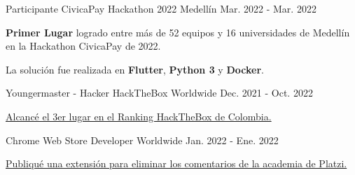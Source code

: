 
\begin{cventries}

  \cventry
    {Participante} %
    {CivicaPay Hackathon 2022} %
    {Medellín} %
    {Mar. 2022 - Mar. 2022} %
    {
      \begin{cvitems} %
        \item {\textbf{Primer Lugar} logrado entre más de 52 equipos y 16 universidades de Medellín en la Hackathon CivicaPay de 2022.}
        \item {La solución fue realizada en \textbf{Flutter}, \textbf{Python 3} y \textbf{Docker}.}
      \end{cvitems}
    }

  \cventry
    {Youngermaster - Hacker} %
    {HackTheBox} %
    {Worldwide} %
    {Dec. 2021 - Oct. 2022} %
    {
      \begin{cvitems} %
        \item {\href{https://app.hackthebox.com/profile/643960}{Alcancé el 3er lugar en el Ranking HackTheBox de Colombia.}}
      \end{cvitems}
    }

  \cventry
    {Chrome Web Store} %
    {Developer} %
    {Worldwide} %
    {Jan. 2022 - Ene. 2022} %
    {
      \begin{cvitems} %
        \item {\href{https://chrome.google.com/webstore/detail/platzi-community-wrapper/dakgbbfpefoofghfbkopnbnpadeblbep}
        {Publiqué una extensión para eliminar los comentarios de la academia de Platzi.}}
      \end{cvitems}
    }



\end{cventries}
